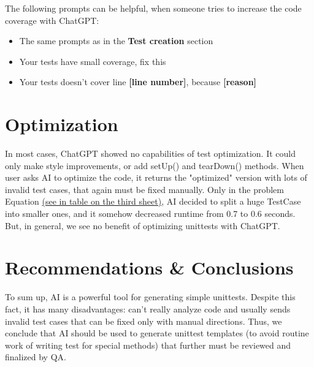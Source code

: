 \documentclass[12pt]{report}
\begin{document}
The following prompts can be helpful, when someone tries to increase the code coverage with ChatGPT:
		\begin{itemize}
			\item The same prompts as in the \textbf{Test creation} section
			\item Your tests have small coverage, fix this
			\item Your tests doesn't cover line \textbf{[line number]}, because \textbf{[reason]}

		\end{itemize}

	\section{Optimization}

	In most cases, ChatGPT showed no capabilities of test optimization. It could only make style improvements, or add
setUp() and tearDown() methods. When user asks AI to optimize the code, it returns the "optimized" version with lots
of invalid test cases, that again must be fixed manually. Only in the problem Equation \href{https://docs.google.com/spreadsheets/d/1qXPyAJsOOpmtxIoGqObwG5mTaLU3IWO0SQRGbjZPhEc/edit#gid=0}{(see in table on the third sheet)}, AI decided to split a huge TestCase into smaller ones, and it somehow decreased runtime from 0.7 to 0.6 seconds. But, in general, we see no benefit of optimizing unittests with ChatGPT.

	\section{Recommendations \& Conclusions}

	To sum up, AI is a powerful tool for generating simple unittests. Despite this fact, it has many disadvantages:
can't really analyze code and usually sends invalid test cases that can be fixed only with manual directions.
Thus, we conclude that AI should be used to generate unittest templates (to avoid routine work of writing test for special
methods) that further must be reviewed and finalized by QA.
\end{document}
